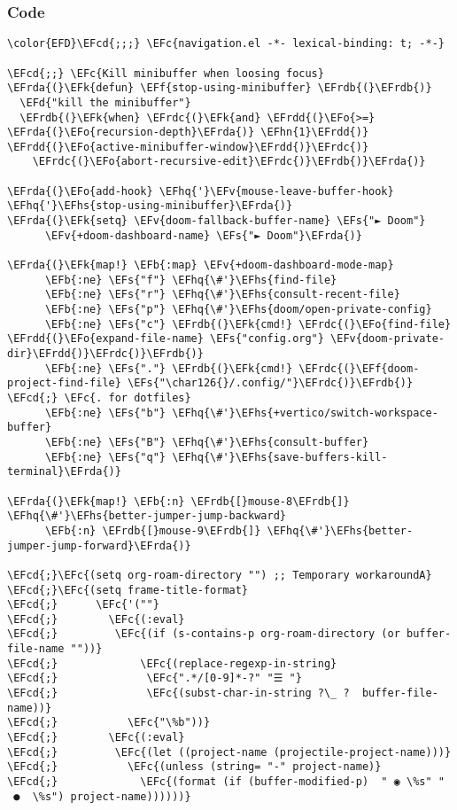 \documentclass[a4wide,10pt]{article}
\newcommand{\EFc}[1]{\textcolor{EFc}{#1}} %
\newcommand{\EFcd}[1]{\textcolor{EFcd}{#1}} %
\newcommand{\EFs}[1]{\textcolor{EFs}{#1}} %
\newcommand{\EFd}[1]{\textcolor{EFd}{#1}} %
\newcommand{\EFk}[1]{\textcolor{EFk}{#1}} %
\newcommand{\EFb}[1]{\textcolor{EFb}{#1}} %
\newcommand{\EFf}[1]{\textcolor{EFf}{#1}} %
\newcommand{\EFv}[1]{\textcolor{EFv}{#1}} %
\newcommand{\EFo}[1]{\textcolor{EFo}{#1}} %
\newcommand{\EFhn}[1]{\textcolor{EFhn}{\textbf{#1}}} %
\newcommand{\EFhq}[1]{\textcolor{EFhq}{#1}} %
\newcommand{\EFhs}[1]{\textcolor{EFhs}{#1}} %
\newcommand{\EFrda}[1]{\textcolor{EFrda}{#1}} %
\newcommand{\EFrdb}[1]{\textcolor{EFrdb}{#1}} %
\newcommand{\EFrdc}[1]{\textcolor{EFrdc}{#1}} %
\newcommand{\EFrdd}[1]{\textcolor{EFrdd}{#1}} %
\begin{document}
\subsubsection{Code}
\label{sec:org6def9d4}
\begin{Code}
\begin{Verbatim}
\color{EFD}\EFcd{;;;} \EFc{navigation.el -*- lexical-binding: t; -*-}

\EFcd{;;} \EFc{Kill minibuffer when loosing focus}
\EFrda{(}\EFk{defun} \EFf{stop-using-minibuffer} \EFrdb{(}\EFrdb{)}
  \EFd{"kill the minibuffer"}
  \EFrdb{(}\EFk{when} \EFrdc{(}\EFk{and} \EFrdd{(}\EFo{>=} \EFrda{(}\EFo{recursion-depth}\EFrda{)} \EFhn{1}\EFrdd{)} \EFrdd{(}\EFo{active-minibuffer-window}\EFrdd{)}\EFrdc{)}
    \EFrdc{(}\EFo{abort-recursive-edit}\EFrdc{)}\EFrdb{)}\EFrda{)}

\EFrda{(}\EFo{add-hook} \EFhq{'}\EFv{mouse-leave-buffer-hook} \EFhq{'}\EFhs{stop-using-minibuffer}\EFrda{)}
\EFrda{(}\EFk{setq} \EFv{doom-fallback-buffer-name} \EFs{"► Doom"}
      \EFv{+doom-dashboard-name} \EFs{"► Doom"}\EFrda{)}

\EFrda{(}\EFk{map!} \EFb{:map} \EFv{+doom-dashboard-mode-map}
      \EFb{:ne} \EFs{"f"} \EFhq{\#'}\EFhs{find-file}
      \EFb{:ne} \EFs{"r"} \EFhq{\#'}\EFhs{consult-recent-file}
      \EFb{:ne} \EFs{"p"} \EFhq{\#'}\EFhs{doom/open-private-config}
      \EFb{:ne} \EFs{"c"} \EFrdb{(}\EFk{cmd!} \EFrdc{(}\EFo{find-file} \EFrdd{(}\EFo{expand-file-name} \EFs{"config.org"} \EFv{doom-private-dir}\EFrdd{)}\EFrdc{)}\EFrdb{)}
      \EFb{:ne} \EFs{"."} \EFrdb{(}\EFk{cmd!} \EFrdc{(}\EFf{doom-project-find-file} \EFs{"\char126{}/.config/"}\EFrdc{)}\EFrdb{)} \EFcd{;} \EFc{. for dotfiles}
      \EFb{:ne} \EFs{"b"} \EFhq{\#'}\EFhs{+vertico/switch-workspace-buffer}
      \EFb{:ne} \EFs{"B"} \EFhq{\#'}\EFhs{consult-buffer}
      \EFb{:ne} \EFs{"q"} \EFhq{\#'}\EFhs{save-buffers-kill-terminal}\EFrda{)}

\EFrda{(}\EFk{map!} \EFb{:n} \EFrdb{[}mouse-8\EFrdb{]} \EFhq{\#'}\EFhs{better-jumper-jump-backward}
      \EFb{:n} \EFrdb{[}mouse-9\EFrdb{]} \EFhq{\#'}\EFhs{better-jumper-jump-forward}\EFrda{)}

\EFcd{;}\EFc{(setq org-roam-directory "") ;; Temporary workaroundA}
\EFcd{;}\EFc{(setq frame-title-format}
\EFcd{;}      \EFc{'(""}
\EFcd{;}        \EFc{(:eval}
\EFcd{;}         \EFc{(if (s-contains-p org-roam-directory (or buffer-file-name ""))}
\EFcd{;}             \EFc{(replace-regexp-in-string}
\EFcd{;}              \EFc{".*/[0-9]*-?" "☰ "}
\EFcd{;}              \EFc{(subst-char-in-string ?\_ ?  buffer-file-name))}
\EFcd{;}           \EFc{"\%b"))}
\EFcd{;}        \EFc{(:eval}
\EFcd{;}         \EFc{(let ((project-name (projectile-project-name)))}
\EFcd{;}           \EFc{(unless (string= "-" project-name)}
\EFcd{;}             \EFc{(format (if (buffer-modified-p)  " ◉ \%s" "  ●  \%s") project-name))))))}


\end{Verbatim}
\end{Code}
\end{document}
